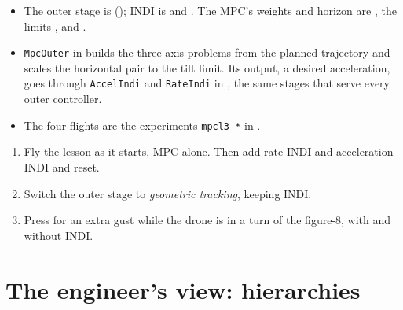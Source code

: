 \begin{inapp}
\begin{itemize}[leftmargin=1.2em]
  \item The outer stage is  (); INDI is  and . The MPC's weights and horizon are , the limits ,  and .
  \item \texttt{MpcOuter} in  builds the three axis problems from the planned trajectory and scales the horizontal pair to the tilt limit. Its output, a desired acceleration, goes through \texttt{AccelIndi} and \texttt{RateIndi} in , the same stages that serve every outer controller.
  \item The four flights are the experiments \texttt{mpcl3-*} in .
\end{itemize}
\end{inapp}


\begin{trythis}
\begin{enumerate}
  \item Fly the lesson as it starts, MPC alone. Then add rate INDI and acceleration INDI and reset.
  \item Switch the outer stage to \emph{geometric tracking}, keeping INDI.
  \item Press  for an extra gust while the drone is in a turn of the figure-8, with and without INDI.
\end{enumerate}
\end{trythis}

\section{The engineer's view: hierarchies}

